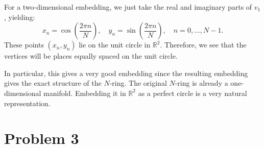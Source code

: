 \documentclass[11pt]{scrartcl}
\begin{document}
\begin{enumerate}[(a)]
    For a two-dimensional embedding, we just take the real and imaginary parts of \( v_1 \), yielding:
    \[
    x_n = \cos \left( \frac{2\pi n}{N} \right), \quad
    y_n = \sin \left( \frac{2\pi n}{N} \right), \quad
    n=0,\dots,N-1.
    \]
    These points \( (x_n, y_n) \) lie on the unit circle in \( \mathbb{R}^2 \).
    Therefore, we see that the vertices will be places equally spaced on the unit circle.

    In particular, this gives a very good embedding since the resulting embedding gives the exact structure of the $N$-ring. The original \( N \)-ring is already a one-dimensional manifold. Embedding it in \( \mathbb{R}^2 \) as a perfect circle is a very natural representation.
\end{enumerate}

\newpage

\section{Problem 3}
\end{document}
